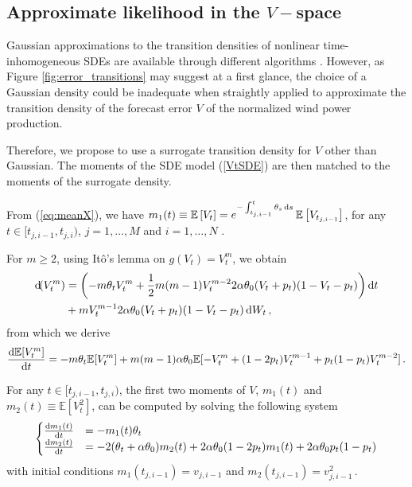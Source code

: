 \documentclass[11pt]{article}
\theoremstyle{definition}
\begin{document}
\subsection{Approximate likelihood  in the $V-$space} \label{moments_ODEs}

Gaussian approximations to the transition densities of nonlinear time-in\-ho\-mo\-geneous SDEs are available through different algorithms \autocite[Chapter 9]{saso}. However, as Figure \ref{fig:error_transitions} may suggest at a first glance, the choice of a Gaussian density could be inadequate when straightly applied to approximate the transition density of the forecast error $V$ of the normalized wind power production. 

Therefore, we propose to use a surrogate transition density for $V$ other than Gaussian. The moments of the SDE model (\ref{VtSDE}) are then matched to the moments of the surrogate density. 

From (\ref{eq:meanX}), we have $m_1(t) \equiv \mathbb{E} \left[V_t\right] = e^{- \int_{t_{j,i-1}}^t \theta_s \dif s} \,\mathbb{E} \left[V_{t_{j,i-1}}\right]$, for any $t\in [t_{j,i-1}, t_{j, i})$, $j = 1, \ldots, M$ and $i = 1, \ldots, N$ .

For $m \geq 2$, using It\^o's lemma on $g(V_t) = V_t^m$, we obtain
\begin{align}
\dif (V_t^m) & = \left( - m \theta_t V_t^m + \frac{1}{2} m (m -1) V_t^{m -2} 2 \alpha \theta_0 (V_t + p_t) (1 - V_t - p_t) \right) \dif t  \nonumber \\
& + m V_t^{m-1} 2 \alpha \theta_0 (V_t + p_t) (1 - V_t - p_t) \dif W_t \,, \nonumber
\end{align}
from which we derive
\begin{equation}
\frac{\dif  \mathbb{E}[ V^m_t]}{\dif t} = - m \theta_t \mathbb{E}[ V^m_t] + m (m-1) \alpha \theta_0  \mathbb{E}[ - V_t^m + (1 - 2 p_t) V_t^{m-1} + p_t (1 -p_t) V_t^{m-2} ] \,.
\end{equation}

For any $t\in [t_{j,i-1}, t_{j, i})$, the first two moments of $V$, $m_1(t)$ and $m_2(t) \equiv \mathbb{E}[V_t^2]$, can be computed by solving the following system
\begin{equation}
\begin{cases}
\frac{\dif  m_1 (t)}{\dif t} &=  - m_1(t)\theta_t   \\
\frac{\dif  m_2 (t)}{\dif t} &=  -2 (\theta_t +\alpha \theta_0) m_2(t) + 2 \alpha\theta_0 (1-2p_t)  m_1(t) + 2 \alpha\theta_0 p_t (1-p_t) 
\end{cases}
\label{Vtmom}
\end{equation}
with initial conditions $m_1(t_{j,i-1})= v_{j, i-1}$ and $m_2(t_{j,i-1})= v_{j, i-1}^2 \,.$
\end{document}
